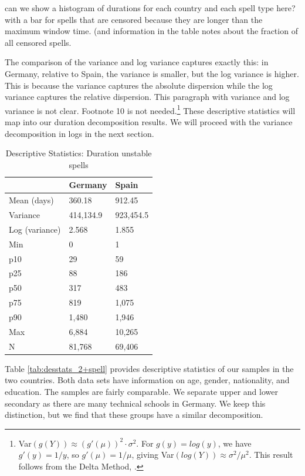 \documentclass[12pt]{article}
\theoremstyle{definition}
\theoremstyle{remark}
\begin{document}
\textcolor{mygreen}{can we show a histogram of durations for each country and each spell type here? with a bar for spells that are censored because they are longer than the maximum window time. (and information in the table notes about the fraction of all censored spells.}

The comparison of the variance and 
log variance captures exactly this: in Germany, relative to Spain, the variance is smaller, but the log variance is higher. 
This is because the variance captures the absolute dispersion while the log variance captures the relative dispersion. \textcolor{mygreen}{This paragraph with variance and log variance is not clear. Footnote 10 is not needed.}\footnote
{Var$(g(Y)) \approx (g'(\mu))^2 \cdot \sigma^2$.
For $g(y) = log(y)$, we have $g'(y) = 1/y$, so $g'(\mu ) = 1/\mu $, giving  Var$(log(Y)) \approx \sigma^2 /\mu^2$.
This result follows from the Delta Method, \cite*{LehmannCasella1998}.} These descriptive statistics will map into our duration decomposition results. We will proceed with the variance decomposition in logs in the next section.



\begin{table}[!httb]
    \centering
    \caption{Descriptive Statistics: Duration unstable spells}
    \begin{tabular}{lll}
\toprule
 & Germany & Spain \\
\midrule
Mean (days) & 360.18 & 912.45 \\
Variance & 414,134.9 & 923,454.5 \\
Log (variance) & 2.568 & 1.855 \\
Min & 0 & 1 \\
p10 & 29 & 59 \\
p25 & 88 & 186 \\
p50 & 317 & 483 \\
p75 & 819 & 1,075 \\
p90 & 1,480 & 1,946 \\
Max & 6,884 & 10,265 \\
N & 81,768 & 69,406 \\[5pt]
\bottomrule
\end{tabular}

\label{tab:desstats_dur}
\end{table}   

Table \ref{tab:desstats_2+spell} provides descriptive statistics of our samples in the two countries. Both data sets have information on age, gender, nationality, and education. The samples are fairly comparable. We separate upper and lower secondary as there are many technical schools in Germany. We keep this distinction, but we find that these groups have a similar decomposition. 
\end{document}
